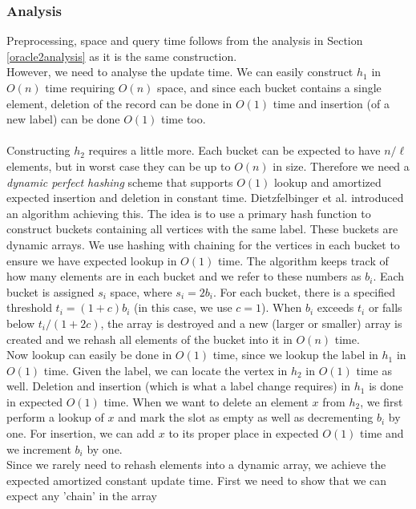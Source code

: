 \subsubsection{Analysis}
Preprocessing, space and query time follows from the analysis in Section
\ref{oracle2analysis} as it is the same construction. \\
However, we need to analyse the update time. We can easily construct $h_1$ in $O(n)$ time
requiring $O(n)$ space, and since each bucket contains a single element, deletion of the
record  can be done in $O(1)$ time and insertion (of a new label) can be done $O(1)$ time
too. \\
\\
Constructing $h_2$ requires a little more. Each bucket can be expected to
have $n/\ell$ elements, but in worst case they can be up to $O(n)$ in size. Therefore we
need a \textit{dynamic perfect hashing} scheme that supports $O(1)$ lookup and
amortized expected insertion and deletion in constant time. Dietzfelbinger et al.
\cite{dietzfelbinger1994dynamic} introduced an algorithm achieving this. The idea is to use a
primary hash function to construct buckets containing all vertices with the same label.
These buckets are dynamic arrays. We use hashing with chaining for the vertices in each bucket to ensure we have expected lookup in $O(1)$ time. The algorithm keeps track of how many elements are in
each bucket and we refer to these numbers as $b_i$. Each bucket is assigned $s_i$ space,
where $s_i=2b_i$. For each bucket, there is a specified threshold $t_i=(1+c)b_i$ (in this
case, we use $c=1$). When $b_i$ exceeds $t_i$ or falls below
$t_i/(1+2c)$, the array is destroyed and a new (larger or smaller) array is created and
we rehash all elements of the bucket into it in $O(n)$ time. \\
Now lookup can easily be done in $O(1)$ time, since we lookup the label in $h_1$ in
$O(1)$ time. Given the label, we can locate the vertex in $h_2$ in $O(1)$ time as well.
Deletion and insertion (which is what a label change requires) in $h_1$ is done in
expected $O(1)$
time. When we want to delete an element $x$ from $h_2$, we first perform a lookup of $x$
and mark the slot as empty as well as decrementing $b_i$ by one. For insertion, we can
add $x$ to its proper place in expected $O(1)$ time and we increment $b_i$ by one. \\
Since we rarely need to rehash elements into a dynamic array, we achieve the expected amortized
constant update time. First we need to show that we can expect any 'chain' in the array
